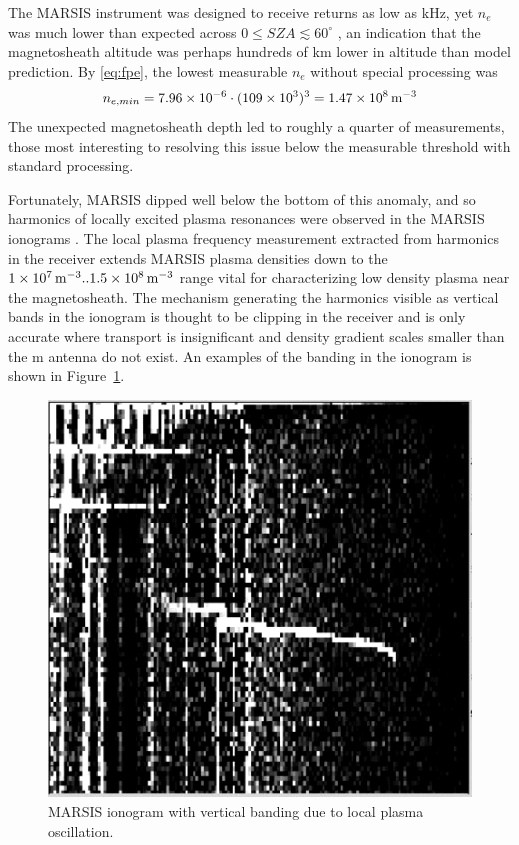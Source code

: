 The MARSIS instrument was designed to receive returns as low as \unit[100]{kHz}, yet $n_e$ was much lower than expected across $ 0 \leq SZA \lesssim 60^\circ$ \citep{andrews2013}, an indication that the magnetosheath altitude was perhaps hundreds of km lower in altitude than model prediction.
By \eqref{eq:fpe}, the lowest measurable $n_e$ without special processing was 
\begin{equation}
n_{e,min} = 7.96\times10^{-6} \cdot (109 \times 10^3)^3  = \unit[1.47\times10^8]{m^{-3}}
\end{equation}
The unexpected magnetosheath depth led to roughly a quarter of measurements, those most interesting to resolving this issue below the measurable threshold with standard processing.

Fortunately, MARSIS dipped well below the bottom of this anomaly, and so harmonics of locally excited plasma resonances were observed in the MARSIS ionograms \citep{gurnett2005}.
The local plasma frequency measurement extracted from harmonics in the receiver extends MARSIS plasma densities down to the  $\unit[1\times10^7]{m^{-3}}..\unit[1.5\times10^8]{m^{-3}}$ range \citep{andrews2013} vital for characterizing low density plasma near the magnetosheath.
The mechanism generating the harmonics visible as vertical bands in the ionogram is thought to be clipping in the receiver \citep{morgan2013} and is only accurate where transport is insignificant and density gradient scales smaller than the \unit[40]{m} antenna do not exist.
An examples of the banding in the ionogram is shown in Figure~\ref{fig:marsisbands}.
\begin{figure}\centering
    \includegraphics[width=0.7\linewidth]{gfx/DataMessy}
    \caption{MARSIS ionogram with vertical banding due to local plasma oscillation.}\label{fig:marsisbands}
\end{figure}
